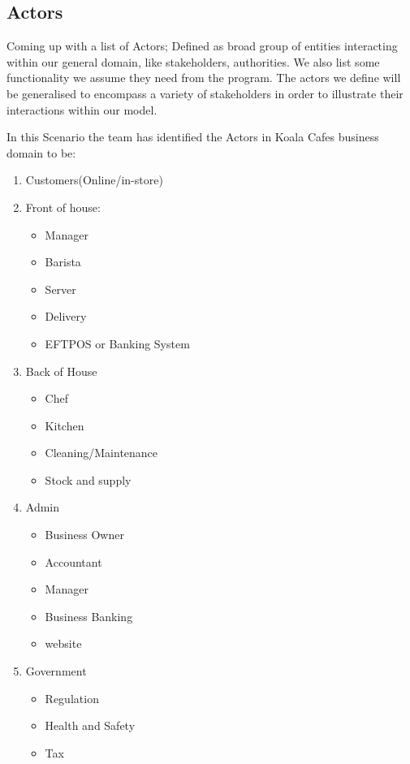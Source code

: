 \documentclass{article}
\begin{document}
\subsection{Actors} 

Coming up with a list of Actors; Defined as broad group of entities interacting within our general domain, like stakeholders, authorities. We also list some functionality we assume they need from the program. The actors we define will be generalised to encompass a variety of stakeholders in order to illustrate their interactions within our model.

In this Scenario the team has identified the Actors in Koala Cafes business domain to be:


\begin{enumerate}
    \item Customers(Online/in-store)
    \item Front of house:
    \begin{itemize}
        \item Manager
        \item Barista
        \item Server
        \item Delivery
        \item EFTPOS or Banking System
    \end{itemize}
    \item Back of House
    \begin{itemize}
        \item Chef
        \item Kitchen
        \item Cleaning/Maintenance
        \item Stock and supply
    \end{itemize}
    \item Admin
    \begin{itemize}
        \item Business Owner
        \item Accountant
        \item Manager
        \item Business Banking
        \item website
    \end{itemize}
    \item Government
    \begin{itemize}
        \item Regulation
        \item Health and Safety
        \item Tax
    \end{itemize}
\end{enumerate}
\end{document}
